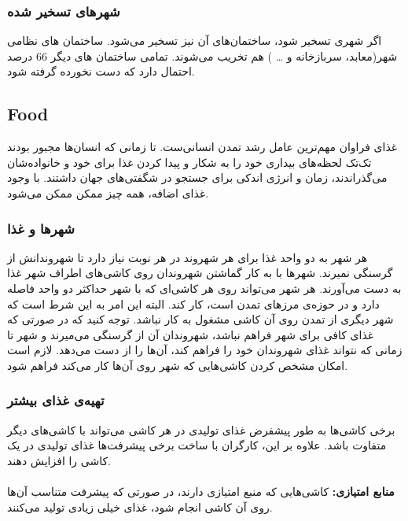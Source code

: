 \documentclass[]{article}
\begin{document}
\subsubsection*{{\titr شهرهای تسخیر شده}}
اگر شهری تسخیر شود، ساختمان‌های آن نیز تسخیر می‌شود. ساختمان های نظامی شهر(معابد، سربازخانه و … ) هم تخریب می‌شوند. تمامی ساختمان های دیگر 66 درصد احتمال دارد که دست نخورده گرفته شود.

\subsection*{{\titr Food}}
غذای فراوان مهم‌ترین عامل رشد تمدن انسانی‌ست. تا زمانی که انسان‌ها مجبور بودند تک‌تک لحظه‌های بیداری خود را به شکار و پیدا کردن غذا برای خود و خانواده‌شان می‌گذراندند، زمان و انرژی اندکی برای جستجو در شگفتی‌های جهان داشتند. با وجود غذای اضافه، همه چیز ممکن ممکن می‌شود.

\subsubsection*{{\titr شهرها و غذا
}}
هر شهر به دو واحد غذا برای هر شهروند در هر نوبت نیاز دارد تا شهروندانش از گرسنگی نمیرند. شهرها با به کار گماشتن شهروندان روی کاشی‌های اطراف شهر غذا به دست می‌آورند. هر شهر می‌تواند روی هر کاشی‌ای که با شهر حداکثر دو واحد فاصله دارد و در حوزه‌ی مرزهای تمدن است، کار کند. البته این امر به این شرط است که شهر دیگری از تمدن روی آن کاشی مشغول به کار نباشد.
توجه کنید که در صورتی که غذای کافی برای شهر فراهم نباشد، شهروندان آن از گرسنگی می‌میرند و شهر تا زمانی که نتواند غذای شهروندان خود را فراهم کند، آن‌ها را از دست می‌دهد.
لازم است امکان مشخص کردن کاشی‌هایی که شهر روی آن‌ها کار می‌کند فراهم شود.

\subsubsection*{{\titr تهیه‌ی غذای بیشتر}}
برخی کاشی‌ها به طور پیشفرض غذای تولیدی در هر کاشی می‌تواند با کاشی‌های دیگر متفاوت باشد. علاوه بر این، کارگران با ساخت برخی پیشرفت‌ها غذای تولیدی در یک کاشی را افزایش دهند.\\
\\
\noindent \textbf{منابع امتیازی:}
کاشی‌هایی که منبع امتیازی دارند، در صورتی که پیشرفت متناسب آن‌ها روی آن کاشی انجام شود، غذای خیلی زیادی تولید می‌کنند.
\end{document}

